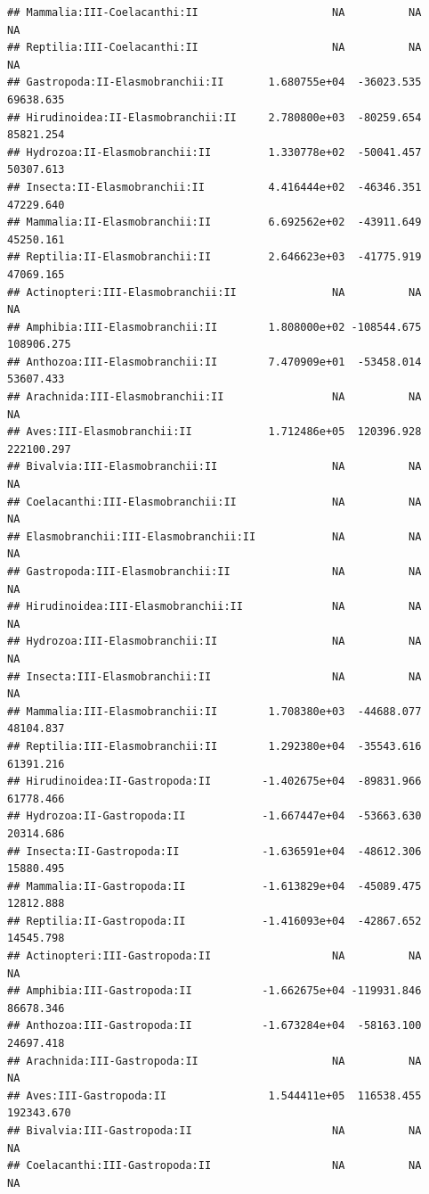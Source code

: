 \documentclass[
  12pt,
]{article}
\begin{document}
\begin{verbatim}
## Mammalia:III-Coelacanthi:II                     NA          NA          NA
## Reptilia:III-Coelacanthi:II                     NA          NA          NA
## Gastropoda:II-Elasmobranchii:II       1.680755e+04  -36023.535   69638.635
## Hirudinoidea:II-Elasmobranchii:II     2.780800e+03  -80259.654   85821.254
## Hydrozoa:II-Elasmobranchii:II         1.330778e+02  -50041.457   50307.613
## Insecta:II-Elasmobranchii:II          4.416444e+02  -46346.351   47229.640
## Mammalia:II-Elasmobranchii:II         6.692562e+02  -43911.649   45250.161
## Reptilia:II-Elasmobranchii:II         2.646623e+03  -41775.919   47069.165
## Actinopteri:III-Elasmobranchii:II               NA          NA          NA
## Amphibia:III-Elasmobranchii:II        1.808000e+02 -108544.675  108906.275
## Anthozoa:III-Elasmobranchii:II        7.470909e+01  -53458.014   53607.433
## Arachnida:III-Elasmobranchii:II                 NA          NA          NA
## Aves:III-Elasmobranchii:II            1.712486e+05  120396.928  222100.297
## Bivalvia:III-Elasmobranchii:II                  NA          NA          NA
## Coelacanthi:III-Elasmobranchii:II               NA          NA          NA
## Elasmobranchii:III-Elasmobranchii:II            NA          NA          NA
## Gastropoda:III-Elasmobranchii:II                NA          NA          NA
## Hirudinoidea:III-Elasmobranchii:II              NA          NA          NA
## Hydrozoa:III-Elasmobranchii:II                  NA          NA          NA
## Insecta:III-Elasmobranchii:II                   NA          NA          NA
## Mammalia:III-Elasmobranchii:II        1.708380e+03  -44688.077   48104.837
## Reptilia:III-Elasmobranchii:II        1.292380e+04  -35543.616   61391.216
## Hirudinoidea:II-Gastropoda:II        -1.402675e+04  -89831.966   61778.466
## Hydrozoa:II-Gastropoda:II            -1.667447e+04  -53663.630   20314.686
## Insecta:II-Gastropoda:II             -1.636591e+04  -48612.306   15880.495
## Mammalia:II-Gastropoda:II            -1.613829e+04  -45089.475   12812.888
## Reptilia:II-Gastropoda:II            -1.416093e+04  -42867.652   14545.798
## Actinopteri:III-Gastropoda:II                   NA          NA          NA
## Amphibia:III-Gastropoda:II           -1.662675e+04 -119931.846   86678.346
## Anthozoa:III-Gastropoda:II           -1.673284e+04  -58163.100   24697.418
## Arachnida:III-Gastropoda:II                     NA          NA          NA
## Aves:III-Gastropoda:II                1.544411e+05  116538.455  192343.670
## Bivalvia:III-Gastropoda:II                      NA          NA          NA
## Coelacanthi:III-Gastropoda:II                   NA          NA          NA

\end{verbatim}
\end{document}
